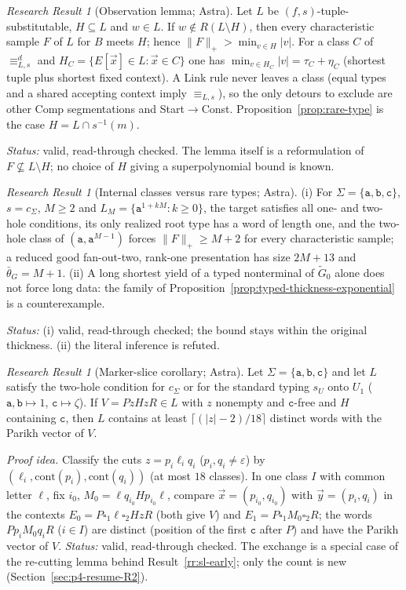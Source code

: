 \documentclass[11pt]{article}
\numberwithin{equation}{section}
\theoremstyle{plain}
\theoremstyle{definition}
\theoremstyle{remark}
\newtheorem{rresult}[theorem]{Research Result}
\newcommand{\tuple}[1]{\vec{#1}}
\newcommand{\blank}{\square}
\newcommand{\eps}{\varepsilon}
\theoremstyle{plain}
\begin{document}
\begin{rresult}[Observation lemma; Astra]
\label{rr:R1-observation}
Let $L$ be $(f,s)$-tuple-substitutable, $H\subseteq L$ and $w\in L$.  If
$w\notin R(L\setminus H)$, then every characteristic sample $F$ of $L$ for $B$ meets
$H$; hence $\|F\|_+>\min_{v\in H}|v|$.  For a class $C$ of $\equiv^d_{L,s}$ and
$H_C=\{E[\tuple x]\in L:\tuple x\in C\}$ one has
$\min_{v\in H_C}|v|=\tau_C+\eta_C$ (shortest tuple plus shortest fixed context).
A Link rule never leaves a class (equal types and a shared accepting context imply
$\equiv_{L,s}$), so the only detours to exclude are other Comp segmentations and
Start$\to$Const.  Proposition~\ref{prop:rare-type} is the case
$H=L\cap s^{-1}(m)$.
\end{rresult}
\noindent\emph{Status:} valid, read-through checked.  The lemma itself is a
reformulation of $F\not\subseteq L\setminus H$; no choice of $H$ giving a
superpolynomial bound is known.

\begin{rresult}[Internal classes versus rare types; Astra]
\label{rr:R1-internal}
(i) For $\Sigma=\{\mathtt a,\mathtt b,\mathtt c\}$, $s=c_\Sigma$, $M\ge2$ and
$L_M=\{\mathtt a^{1+kM}:k\ge0\}$, the target satisfies all one- and two-hole
conditions, its only realized root type has a word of length one, and the two-hole
class of $(\mathtt a,\mathtt a^{M-1})$ forces $\|F\|_+\ge M+2$ for every characteristic
sample; a reduced good fan-out-two, rank-one presentation has size $2M+13$ and
$\bar\theta_G=M+1$.  (ii) A long shortest yield of a typed nonterminal of
$\widetilde G_0$ alone does not force long data: the family of
Proposition~\ref{prop:typed-thickness-exponential} is a counterexample.
\end{rresult}
\noindent\emph{Status:} (i) valid, read-through checked; the bound stays within the
original thickness.  (ii) the literal inference is refuted.

\begin{rresult}[Marker-slice corollary; Astra]
\label{rr:R1-marker-slice}
Let $\Sigma=\{\mathtt a,\mathtt b,\mathtt c\}$ and let $L$ satisfy the two-hole condition
for $c_\Sigma$ or for the standard typing $s_U$ onto $U_1$
($\mathtt a,\mathtt b\mapsto1$, $\mathtt c\mapsto\zeta$).  If $V=PzHzR\in L$ with $z$
nonempty and $\mathtt c$-free and $H$ containing $\mathtt c$, then $L$ contains at least
$\lceil(|z|-2)/18\rceil$ distinct words with the Parikh vector of $V$.
\end{rresult}
\noindent\emph{Proof idea.} Classify the cuts $z=p_i\ell_iq_i$ ($p_i,q_i\ne\eps$) by
$(\ell_i,\mathrm{cont}(p_i),\mathrm{cont}(q_i))$ (at most $18$ classes).  In one class
$I$ with common letter $\ell$, fix $i_0$, $M_0=\ell q_{i_0}Hp_{i_0}\ell$, compare
$\tuple x=(p_{i_0},q_{i_0})$ with $\tuple y=(p_i,q_i)$ in the contexts
$E_0=P\blank_1\ell\blank_2HzR$ (both give $V$) and $E_1=P\blank_1M_0\blank_2R$; the words
$Pp_iM_0q_iR$ ($i\in I$) are distinct (position of the first $\mathtt c$ after $P$) and
have the Parikh vector of $V$.  \emph{Status:} valid, read-through checked.
The exchange is a special case of the re-cutting lemma behind
Result~\ref{rr:sl-early}; only the count is new (Section~\ref{sec:p4-resume-R2}).
\end{document}
